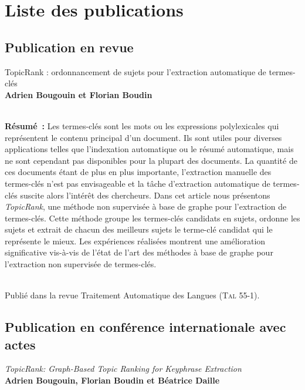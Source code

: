 \chapter*{Liste des publications}
  \section*{Publication en revue}

  TopicRank : ordonnancement de sujets pour l'extraction automatique de
  termes-clés\\\textbf{Adrien Bougouin et Florian
  Boudin}\\\cite{bougouin2014topicrank}

  ~\\\textbf{Résumé~:}
  Les termes-clés sont les mots ou les expressions polylexicales qui
  représentent le contenu principal d'un document. Ils sont utiles pour diverses
  applications telles que l'indexation automatique ou le résumé automatique,
  mais ne sont cependant pas disponibles pour la plupart des documents. La
  quantité de ces documents étant de plus en plus importante, l'extraction
  manuelle des termes-clés n'est pas envisageable et la tâche d'extraction
  automatique de termes-clés suscite alors l'intérêt des chercheurs. Dans cet
  article nous présentons \textit{Topic\-Rank}, une méthode non supervisée à
  base de graphe pour l'extraction de termes-clés. Cette méthode groupe les
  termes-clés candidats en sujets, ordonne les sujets et extrait de chacun des
  meilleurs sujets le terme-clé candidat qui le représente le mieux. Les
  expériences réalisées montrent une amélioration significative vis-à-vis de
  l'état de l'art des méthodes à base de graphe pour l'extraction non supervisée
  de termes-clés.

  ~\\Publié dans la revue Traitement Automatique des Langues (\textsc{Tal}
  55-1).

  \section*{Publication en conférence internationale avec actes}

  \textit{TopicRank: Graph-Based Topic Ranking for Keyphrase
  Extraction}\\\textbf{Adrien Bougouin, Florian Boudin et Béatrice
  Daille}\\\cite{bougouin2013topicrank}

